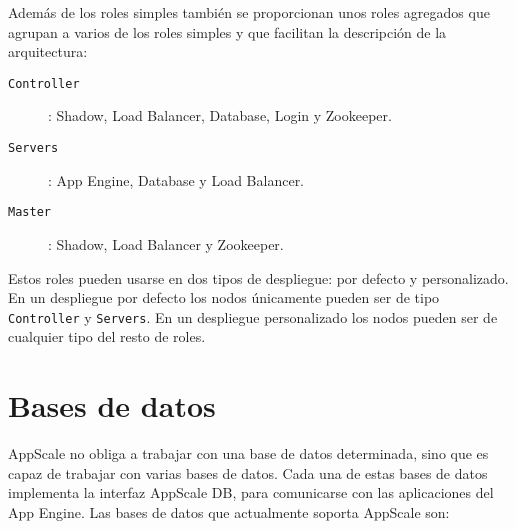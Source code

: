 Además de los roles simples también se proporcionan unos roles agregados que agrupan a varios de los roles simples y que facilitan la descripción de la arquitectura:

\begin{description}
\item[\texttt{Controller}]: Shadow, Load Balancer, Database, Login y Zookeeper.
\item[\texttt{Servers}]: App Engine, Database y Load Balancer.
\item[\texttt{Master}]: Shadow, Load Balancer y Zookeeper.
\end{description}

Estos roles pueden usarse en dos tipos de despliegue: por defecto y personalizado. En un despliegue por defecto los nodos únicamente pueden ser de tipo \texttt{Controller} y \texttt{Servers}. En un despliegue personalizado los nodos pueden ser de cualquier tipo del resto de roles.


\section{Bases de datos}


AppScale no obliga a trabajar con una base de datos determinada, sino que es capaz de trabajar con varias bases de datos. Cada una de estas bases de datos implementa la interfaz AppScale DB, para comunicarse con las aplicaciones del App Engine. Las bases de datos que actualmente soporta AppScale son:

